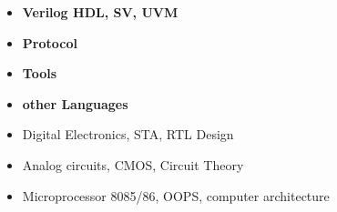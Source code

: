 \begin{itemize}
\item\bf{Verilog HDL, SV, UVM}
\item\bf{Protocol}
\item\bf{Tools}
\item\bf{other Languages}

\end{itemize}




\begin{itemize}
\item Digital Electronics, STA, RTL Design

\item Analog circuits, CMOS, Circuit Theory

\item Microprocessor 8085/86, OOPS, computer architecture
\end{itemize}


